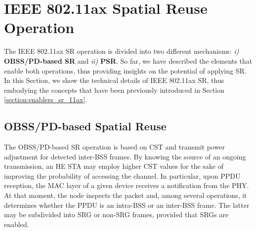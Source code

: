 \documentclass{article}
\begin{document}

\section{IEEE 802.11ax Spatial Reuse Operation}
\label{section:operation_sr_11ax}
The IEEE 802.11ax SR operation is divided into two different mechanisms: \emph{i)} \textbf{OBSS/PD-based SR} and \emph{ii)} \textbf{PSR}. So far, we have described the elements that enable both operations, thus providing insights on the potential of applying SR. In this Section, we show the technical details of IEEE 802.11ax SR, thus embodying the concepts that have been previously introduced in Section \ref{section:enablers_sr_11ax}.

\subsection{OBSS/PD-based Spatial Reuse}
\label{section:obss_pd_based}
The OBSS/PD-based SR operation is based on CST and transmit power adjustment for detected inter-BSS frames. By knowing the source of an ongoing transmission, an HE STA may employ higher CST values for the sake of improving the probability of accessing the channel. In particular, upon PPDU reception, the MAC layer of a given device receives a notification from the PHY. At that moment, the node inspects the packet and, among several operations, it determines whether the PPDU is an intra-BSS or an inter-BSS frame. The latter may be subdivided into SRG or non-SRG frames, provided that SRGs are enabled.

\end{document}
